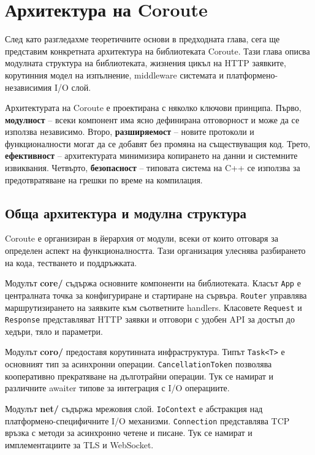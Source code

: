 \section{Архитектура на Coroute}
\label{sec:architecture}

След като разгледахме теоретичните основи в предходната глава, сега ще представим конкретната архитектура на библиотеката Coroute. Тази глава описва модулната структура на библиотеката, жизнения цикъл на HTTP заявките, корутинния модел на изпълнение, middleware системата и платформено-независимия I/O слой.

Архитектурата на Coroute е проектирана с няколко ключови принципа. Първо, \textbf{модулност} -- всеки компонент има ясно дефинирана отговорност и може да се използва независимо. Второ, \textbf{разширяемост} -- новите протоколи и функционалности могат да се добавят без промяна на съществуващия код. Трето, \textbf{ефективност} -- архитектурата минимизира копирането на данни и системните извиквания. Четвърто, \textbf{безопасност} -- типовата система на C++ се използва за предотвратяване на грешки по време на компилация.

\subsection{Обща архитектура и модулна структура}

Coroute е организиран в йерархия от модули, всеки от които отговаря за определен аспект на функционалността. Тази организация улеснява разбирането на кода, тестването и поддръжката.

Модулът \textbf{core/} съдържа основните компоненти на библиотеката. Класът \texttt{App} е централната точка за конфигуриране и стартиране на сървъра. \texttt{Router} управлява маршрутизирането на заявките към съответните handlers. Класовете \texttt{Request} и \texttt{Response} представляват HTTP заявки и отговори с удобен API за достъп до хедъри, тяло и параметри.

Модулът \textbf{coro/} предоставя корутинната инфраструктура. Типът \texttt{Task<T>} е основният тип за асинхронни операции. \texttt{CancellationToken} позволява кооперативно прекратяване на дълготрайни операции. Тук се намират и различните awaiter типове за интеграция с I/O операциите.

Модулът \textbf{net/} съдържа мрежовия слой. \texttt{IoContext} е абстракция над платформено-специфичните I/O механизми. \texttt{Connection} представлява TCP връзка с методи за асинхронно четене и писане. Тук се намират и имплементациите за TLS и WebSocket.

